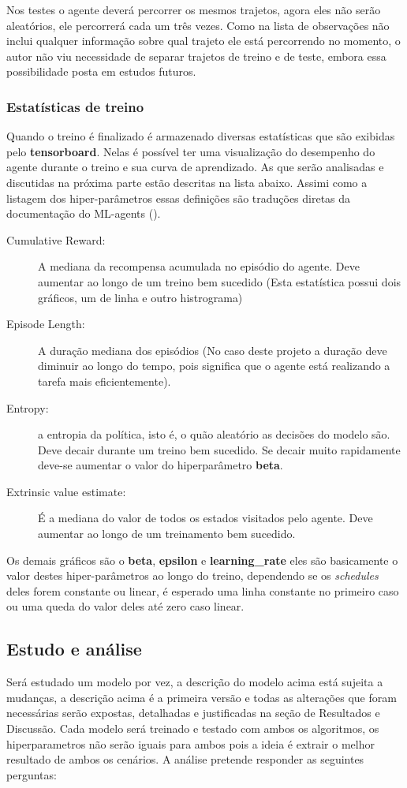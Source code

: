 Nos testes o agente deverá percorrer os mesmos trajetos, agora eles não serão aleatórios, ele percorrerá cada um três vezes. Como na lista de observações não inclui qualquer informação sobre qual trajeto ele está percorrendo no momento, o autor não viu necessidade de separar trajetos de treino e de teste, embora essa possibilidade posta em estudos futuros.

\subsubsection*{Estatísticas de treino}
Quando o treino é finalizado é armazenado diversas estatísticas que são exibidas pelo \textbf{tensorboard}. Nelas é possível ter uma visualização do desempenho do agente durante o treino e sua curva de aprendizado. As que serão analisadas e discutidas na próxima parte estão descritas na lista abaixo. Assimi como a listagem dos hiper-parâmetros essas definições são traduções diretas da documentação do ML-agents ().

\begin{description}
   \item [Cumulative Reward:] A mediana da recompensa acumulada no episódio do agente. Deve aumentar ao longo de um treino bem sucedido (Esta estatística possui dois gráficos, um de linha e outro histrograma)
   \item [Episode Length:] A duração mediana dos episódios (No caso deste projeto a duração deve diminuir ao longo do tempo, pois significa que o agente está realizando a tarefa mais eficientemente).
   \item [Entropy:] a entropia da política, isto é, o quão aleatório as decisões do modelo são. Deve decair durante um treino bem sucedido. Se decair muito rapidamente deve-se aumentar o valor do hiperparâmetro \textbf{beta}.
   \item [Extrinsic value estimate:] É a mediana do valor de todos os estados visitados pelo agente. Deve aumentar ao longo de um treinamento bem sucedido.
\end{description}

Os demais gráficos são o \textbf{beta}, \textbf{epsilon} e \textbf{learning\_rate} eles são basicamente o valor destes hiper-parâmetros ao longo do treino, dependendo se os \textit{schedules} deles forem constante ou linear, é esperado uma linha constante no primeiro caso ou uma queda do valor deles até zero caso linear.

\subsection{Estudo e análise}
Será estudado um modelo por vez, a descrição do modelo acima está sujeita a mudanças, a descrição acima é a primeira versão e todas as alterações que foram necessárias serão expostas, detalhadas e justificadas na seção de Resultados e Discussão. Cada modelo será treinado e testado com ambos os algoritmos, os hiperparametros não serão iguais para ambos pois a ideia é extrair o melhor resultado de ambos os cenários. A análise pretende responder as seguintes perguntas:

